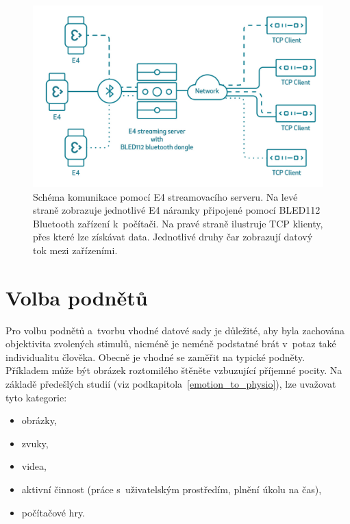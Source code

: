         \vspace{3mm}
        
        \begin{figure}[H]
            \centering
            \includegraphics[scale=0.4]{obrazky-figures/E4_streaming_server_scheme.png}
            \caption{Schéma komunikace pomocí E4 streamovacího serveru. Na levé straně zobrazuje jednotlivé E4 náramky připojené pomocí BLED112 Bluetooth zařízení k~počítači. Na pravé straně ilustruje TCP klienty, přes které lze získávat data. Jednotlivé druhy čar zobrazují datový tok mezi zařízeními.}
            \label{fig:server_fig}
        \end{figure}
    
    \section{Volba podnětů}
    \label{podnety_volba}  
    
    Pro volbu podnětů a~tvorbu vhodné datové sady je důležité, aby byla zachována objektivita zvolených stimulů, nicméně je neméně podstatné brát v~potaz také individualitu člověka. Obecně je vhodné se zaměřit na typické podněty. Příkladem může být obrázek roztomilého štěněte vzbuzující příjemné pocity. Na základě předešlých studií (viz podkapitola~\ref{emotion_to_physio}), lze uvažovat tyto kategorie:
    \begin{itemize}
        \item obrázky,
        \item zvuky,
        \item videa,
        \item aktivní činnost (práce s~uživatelským prostředím, plnění úkolu na čas),
        \item počítačové hry.
    \end{itemize}
    
